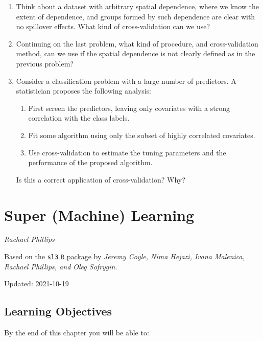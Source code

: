 \documentclass[
  12pt, krantz2,
]{krantz}
\newcommand{\passthrough}[1]{#1}
\providecommand{\tightlist}{%
  \setlength{\itemsep}{0pt}\setlength{\parskip}{0pt}}
\theoremstyle{definition}
\theoremstyle{definition}
\theoremstyle{definition}
\newcommand{\1}{\mathbbm{1}}
\begin{document}
\begin{enumerate}
\def\labelenumi{\arabic{enumi}.}
\item
  Think about a dataset with arbitrary spatial dependence, where we know
  the extent of dependence, and groups formed by such dependence are clear
  with no spillover effects. What kind of cross-validation can we use?
\item
  Continuing on the last problem, what kind of procedure, and cross-validation
  method, can we use if the spatial dependence is not clearly defined as in the
  previous problem?
\item
  Consider a classification problem with a large number of predictors. A
  statistician proposes the following analysis:

  \begin{enumerate}
  \def\labelenumii{\alph{enumii}.}
  \tightlist
  \item
    First screen the predictors, leaving only covariates with a strong
    correlation with the class labels.
  \item
    Fit some algorithm using only the subset of highly correlated covariates.
  \item
    Use cross-validation to estimate the tuning parameters and the performance
    of the proposed algorithm.
  \end{enumerate}

  Is this a correct application of cross-validation? Why?
\end{enumerate}

\hypertarget{sl3}{%
\chapter{Super (Machine) Learning}\label{sl3}}

\emph{Rachael Phillips}

Based on the \href{https://github.com/tlverse/sl3}{\passthrough{\lstinline!sl3!} \passthrough{\lstinline!R!} package} by \emph{Jeremy
Coyle, Nima Hejazi, Ivana Malenica, Rachael Phillips, and Oleg Sofrygin}.

Updated: 2021-10-19

\hypertarget{learning-objectives}{%
\section*{Learning Objectives}\label{learning-objectives}}


By the end of this chapter you will be able to:
\end{document}

